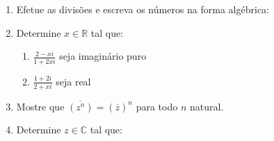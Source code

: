 \documentclass[a4paper,5pt]{amsbook}
\newcommand{\ds}{\displaystyle}
\begin{document}
\vspace{1cm}
\begin{enumerate}
	\vspace{0.5cm}
	\item Efetue as divis\~oes e escreva os n\'umeros na forma alg\'ebrica:


	\vspace{0.5cm}
	\item Determine $x \in \mathbb{R}$ tal que:
		\begin{enumerate}
			\vspace{0.3cm}
			\item $\ds\frac{2-xi}{1+2xi}$ seja imagin\'ario puro
			\vspace{0.3cm}
			\item $\ds\frac{1+2i}{2+xi}$ seja real
		\end{enumerate}

	\vspace{0.5cm}
	\item Mostre que $\overline{(z^n)} = {(\overline{z})}^n$ para todo $n$ natural.

	\vspace{0.5cm}
	\item Determine $z \in \mathbb{C}$ tal que:



\end{enumerate}
\end{document}
